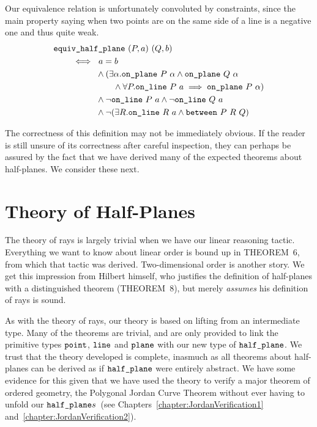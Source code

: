 Our equivalence relation is unfortunately convoluted by constraints, since the main property saying when two points are on the same side of a line is a negative one and thus quite weak.
\begin{equation}\label{eq:SameSidePlaneDef}
  \begin{split}
    & \code{equiv\_half\_plane}\ (P,a)\ (Q,b)\\
    & \qquad\iff\ a=b \\
    & \qquad\quad\qquad \wedge (\exists \alpha. \code{on\_plane}\ P\ \alpha \wedge \code{on\_plane}\ Q\ \alpha\\
    & \qquad\quad\qquad\qquad \wedge \forall P. \code{on\_line}\ P\ a \implies \code{on\_plane}\ P\ \alpha)\\
    & \qquad\quad\qquad \wedge \neg\code{on\_line}\ P\ a \wedge \neg\code{on\_line}\ Q\ a\\
    & \qquad\quad\qquad \wedge \neg(\exists R. \code{on\_line}\ R\ a \wedge \between{P}{R}{Q})
  \end{split}
\end{equation}

The correctness of this definition may not be immediately obvious. If the reader is still unsure of its correctness after careful inspection, they can perhaps be assured by the fact that we have derived many of the expected theorems about half-planes. We consider these next.

\section{Theory of Half-Planes}\label{sec:HalfPlaneTheory}
The theory of rays is largely trivial when we have our linear reasoning tactic. Everything we want to know about linear order is bound up in THEOREM~6, from which that tactic was derived. Two-dimensional order is another story. We get this impression from Hilbert himself, who justifies the definition of half-planes with a distinguished theorem (THEOREM~8), but merely \emph{assumes} his definition of rays is sound.

As with the theory of rays, our theory is based on lifting from an intermediate type. Many of the theorems are trivial, and are only provided to link the primitive types $\texttt{point}$, $\texttt{line}$ and $\texttt{plane}$ with our new type of $\texttt{half\_plane}$. We trust that the theory developed is complete, inasmuch as all theorems about half-planes can be derived as if $\texttt{half\_plane}$ were entirely abstract. We have some evidence for this given that we have used the theory to verify a major theorem of ordered geometry, the Polygonal Jordan Curve Theorem without ever having to unfold our $\texttt{half\_plane}s$~(see Chapters~\ref{chapter:JordanVerification1} and~\ref{chapter:JordanVerification2}).

